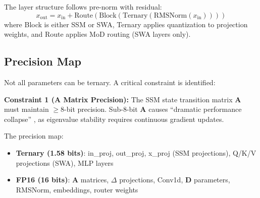 \documentclass{article}
\begin{document}
\begin{table}[t]
\centering
\small
\caption{Model configurations at different scales. Compression ratio vs FP16 (2 bytes/param) accounts for ternary weight packing and full-precision non-ternary parameters.}
\label{tab:model_configs}
%
\end{table}

The layer structure follows pre-norm with residual:
\begin{equation}
x_\text{out} = x_\text{in} + \text{Route}(\text{Block}(\text{Ternary}(\text{RMSNorm}(x_\text{in}))))
\end{equation}
where Block is either SSM or SWA, Ternary applies quantization to projection weights, and Route applies MoD routing (SWA layers only).

\subsection{Precision Map}

Not all parameters can be ternary. A critical constraint is identified:

\noindent\textbf{Constraint 1 (A Matrix Precision):} The SSM state transition matrix $\mathbf{A}$ must maintain $\geq 8$-bit precision. Sub-8-bit $\mathbf{A}$ causes ``dramatic performance collapse'' \citep{bimamba2024}, as eigenvalue stability requires continuous gradient updates.

The precision map:
\begin{itemize}
    \item \textbf{Ternary (1.58 bits)}: in\_proj, out\_proj, x\_proj (SSM projections), Q/K/V projections (SWA), MLP layers
    \item \textbf{FP16 (16 bits)}: $\mathbf{A}$ matrices, $\Delta$ projections, Conv1d, $\mathbf{D}$ parameters, RMSNorm, embeddings, router weights
\end{itemize}
\end{document}
